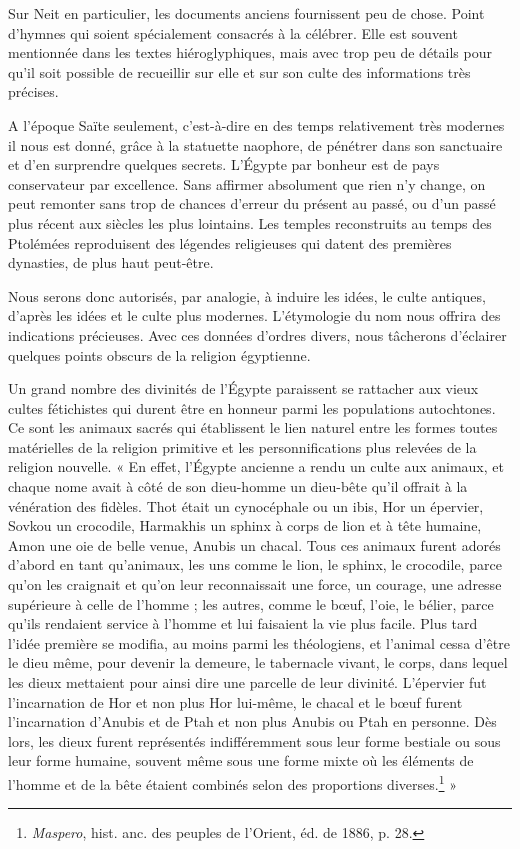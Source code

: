 \documentclass[a4paper, 11pt, oneside]{article}
\begin{document}
Sur Neit en particulier, les documents anciens fournissent peu de chose. Point d'hymnes qui soient spécialement consacrés à la célébrer. Elle est souvent mentionnée dans les textes hiéroglyphiques, mais avec trop peu de détails pour qu'il soit possible de recueillir sur elle et sur son culte des informations très précises.

A l'époque Saïte seulement, c'est-à-dire en des temps relativement très modernes il nous est donné, grâce à la statuette naophore, de pénétrer dans son sanctuaire et d'en surprendre quelques secrets. L'Égypte par bonheur est de pays conservateur par excellence. Sans affirmer absolument que rien n'y change, on peut remonter sans trop de chances d'erreur du présent au passé, ou d'un passé plus récent aux siècles les plus lointains. Les temples reconstruits au temps des Ptolémées reproduisent des légendes religieuses qui datent des premières dynasties, de plus haut peut-être.

Nous serons donc autorisés, par analogie, à induire les idées, le culte antiques, d'après les idées et le culte plus modernes. L'étymologie du nom nous offrira des indications précieuses. Avec ces données d'ordres divers, nous tâcherons d'éclairer quelques points obscurs de la religion égyptienne.

Un grand nombre des divinités de l'Égypte paraissent se rattacher aux vieux cultes fétichistes qui durent être en honneur parmi les populations autochtones. Ce sont les animaux sacrés qui établissent le lien naturel entre les formes toutes matérielles de la religion primitive et les personnifications plus relevées de la religion nouvelle. « En effet, l'Égypte ancienne a rendu un culte aux animaux, et chaque nome avait à côté de son dieu-homme un dieu-bête qu'il offrait à la vénération des fidèles. Thot était un cynocéphale ou un ibis, Hor un épervier, Sovkou un crocodile, Harmakhis un sphinx à corps de lion et à tête humaine, Amon une oie de belle venue, Anubis un chacal. Tous ces animaux furent adorés d'abord en tant qu'animaux, les uns comme le lion, le sphinx, le crocodile, parce qu'on les craignait et qu'on leur reconnaissait une force, un courage, une adresse supérieure à celle de l'homme ; les autres, comme le bœuf, l'oie, le bélier, parce qu'ils rendaient service à l'homme et lui faisaient la vie plus facile. Plus tard l'idée première se modifia, au moins parmi les théologiens, et l'animal cessa d'être le dieu même, pour devenir la demeure, le tabernacle vivant, le corps, dans lequel les dieux mettaient pour ainsi dire une parcelle de leur divinité. L'épervier fut l'incarnation de Hor et non plus Hor lui-même, le chacal et le bœuf furent l'incarnation d'Anubis et de Ptah et non plus Anubis ou Ptah en personne. Dès lors, les dieux furent représentés indifféremment sous leur forme bestiale ou sous leur forme humaine, souvent même sous une forme mixte où les éléments de l'homme et de la bête étaient combinés selon des proportions diverses.\footnote{\emph{Maspero}, hist. anc. des peuples de l'Orient, éd. de 1886, p. 28.} »
\end{document}
